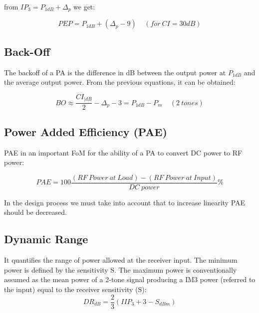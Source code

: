 from $IP_3=P_{1dB}+\Delta_p$ we get:

\begin{equation}
	PEP= P_{1dB} + (\Delta_p -9 )   \ \ \ \ \ (for \  CI=30dB)
\end{equation}


\subsection{Back-Off} %
\label{sub:back_off}

The backoff of a PA is the difference in dB between the output power at $P_{1dB}$ and the average output power. From the previous equations, it can be obtained:

\begin{equation}
	BO\approx \frac{CI_{|dB}}{2}-\Delta_p-3= P_{1dB}-P_m \ \ \ \ \ (2  \ tones)
\end{equation}


\subsection{Power Added Efficiency (PAE)} %
\label{sub:power_added_efficiency}


PAE in an important FoM for the ability of a PA to convert DC power to RF power:

\begin{equation}
	PAE= 100\frac{(RF \ Power \ at \ Load)- (RF \ Power \ at \ Input)}{DC \ power}\%
\end{equation}

In the design process we must take into account that to increase linearity PAE should be decreased.

\subsection{Dynamic Range} %
\label{sub:dynamic_range}

It quantifies the range of power allowed at the receiver input.
The minimum power is defined by the sensitivity S.
The maximum power is conventionally assumed as the mean power of a 2-tone signal producing a IM3 power (referred to the input) equal to the receiver sensitivity (S):
\begin{equation}
DR_{dB}= \frac{2}{3}(IIP_3+3-S_{dBm})	
\end{equation}

